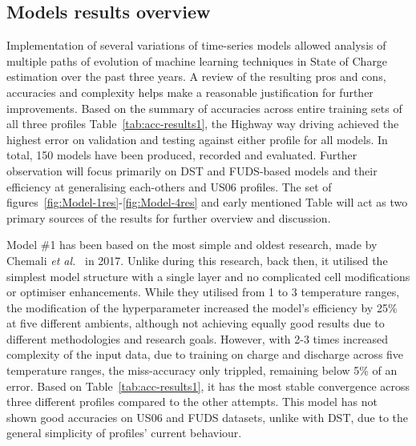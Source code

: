 %
%
\subsection{Models results overview}
Implementation of several variations of time-series models allowed analysis of multiple paths of evolution of machine learning techniques in State of Charge estimation over the past three years.
A review of the resulting pros and cons, accuracies and complexity helps make a reasonable justification for further improvements.
Based on the summary of accuracies across entire training sets of all three profiles Table~\ref{tab:acc-results1}, the Highway way driving achieved the highest error on validation and testing against either profile for all models.
In total, 150 models have been produced, recorded and evaluated.
Further observation will focus primarily on DST and FUDS-based models and their efficiency at generalising each-others and US06 profiles.
The set of figures~\ref{fig:Model-1res}-\ref{fig:Model-4res} and early mentioned Table will act as two primary sources of the results for further overview and discussion.

%
%
Model \#1 has been based on the most simple and oldest research, made by Chemali \textit{et al.}~\cite{Chemali2017} in 2017.
Unlike during this research, back then, it utilised the simplest model structure with a single layer and no complicated cell modifications or optimiser enhancements.
While they utilised from 1 to 3 temperature ranges, the modification of the hyperparameter increased the model's efficiency by 25\% at five different ambients, although not achieving equally good results due to different methodologies and research goals.
However, with 2-3 times increased complexity of the input data, due to training on charge and discharge across five temperature ranges, the miss-accuracy only trippled, remaining below 5\% of an error.
Based on Table~\ref{tab:acc-results1}, it has the most stable convergence across three different profiles compared to the other attempts.
This model has not shown good accuracies on US06 and FUDS datasets, unlike with DST, due to the general simplicity of profiles' current behaviour.


